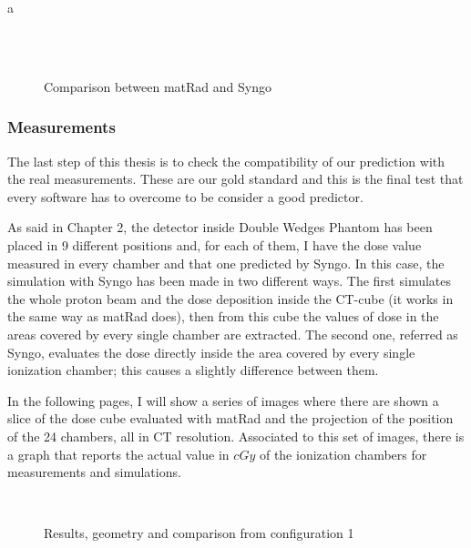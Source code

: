 \documentclass[12pt, a4paper, twoside]{book}
\begin{document}
a

\begin{figure}[t]
\centering
{} \\
 \\
 \quad
\caption{Comparison between matRad and Syngo}
\label{fig:SyngoMat2}
\end{figure}

\subsubsection{Measurements}
The last step of this thesis is to check the compatibility of our prediction with the real measurements. These are our gold standard and this is the final test that every software has to overcome to be consider a good predictor.

As said in Chapter 2, the detector inside Double Wedges Phantom has been placed in 9 different positions and, for each of them, I have the dose value measured in every chamber and that one predicted by Syngo. In this case, the simulation with Syngo has been made in two different ways. The first simulates the whole proton beam and the dose deposition inside the CT-cube (it works in the same way as matRad does), then from this cube the values of dose in the areas covered by every single chamber are extracted. The second one, referred as Syngo, evaluates the dose directly inside the area covered by every single ionization chamber; this causes a slightly difference between them.

In the following pages, I will show a series of images where there are shown a slice of the dose cube evaluated with matRad and the projection of the position of the 24 chambers, all in CT resolution. Associated to this set of images, there is a graph that reports the actual value in $cGy$ of the ionization chambers for measurements and simulations.
\newpage
\begin{figure}[h!]
\centering
{} \quad
{} \\
 \quad
\caption{Results, geometry and comparison from configuration 1}
\label{fig:pos1}
\end{figure}
\end{document}

